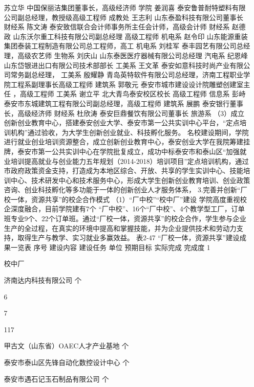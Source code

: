 苏立华
中国保丽洁集团董事长，高级经济师
学院
姜润喜
泰安鲁普耐特塑料有限公司副总经理，教授级高级工程师
成教处
王志利
山东泰盈科技有限公司董事长
财经系
陈文涛
泰安致信联合会计师事务所主任会计师，高级会计师
财经系
赵德政
山东沃尔重工科技有限公司副总经理  高级工程师
机电系
赵令印
山东能源重装集团泰装工程制造有限公司总工程师，高工
机电系
刘桂军
泰丰园艺有限公司总经理，高级农艺师
生物系
刘庆山
山东泰医医疗器械有限公司总经理
汽电系
纪恩峰
山东岱银进出口有限公司技术部部长
工美系
王文革
泰安如意科技时尚产业有限公司常务副总经理，
工美系
殷耀静
青岛英特软件有限公司总经理，济南工程职业学院工程系副理事长高级工程师
建筑系
郭敬元
泰安市城市建设设计院雕塑创建室主任 ，高级工程师
工美系
谢立平
北大青鸟泰安校区校长 高级工程师
信息系
彭峙
泰安市东城建筑工程有限公司副总经理，高级工程师
建筑系
展鹏
泰安银行董事长，高级经济师
财经系
杜欣涛
泰安巨鼎餐饮有限公司董事长
旅游系
（3）成立创新创业教育中心，搭建泰安创业大学、泰安市第一公共实训中心平台，“定点培训机构”通过验收，为大学生创新创业就业、科技孵化服务。
名校建设期间，学院进行就业创业培训资源整合，成立创新创业教育中心，泰安创业大学在我院筹建挂牌，泰安市第一公共实训中心在学院批复成立，成功中标泰安市和泰山区“加强就业培训提高就业与创业能力五年规划（2014-2018）培训项目”定点培训机构，通过市政府政策资金支持，打造成为本地区综合、开放、共享的学生实训中心、技能培训中心、技术研发中心和技术服务中心，形成大学生创新创业教育培训、创业政策咨询、创业科技孵化等多功能于一体的创新创业人才服务体系，
3.完善并创新“厂校一体，资源共享”的校企合作模式
（1）“厂中校”“校中厂”建设
学院高度重视校企深度融合，目前学院建有7个 “厂中校”、16个“厂中校”、4个教学型工厂，订单班专业9个、22个订单班。通过“厂校一体，资源共享”的校企合作，学生参与企业生产的全过程，在真实的环境中提高和掌握技能，并为企业提供技术和劳动力支持，取得生产与教学、实习就业多赢效益。 
表2-47  “厂校一体，资源共享”建设成果一览表
序号
建设内容
建设任务
单位
预期目标
实际完成
完成度
1

校中厂

济南达内科技有限公司
个

6


7


117%



甲古文（山东省）OAEC人才产业基地
个





泰安市泰山区先锋自动化数控设计中心
个





泰安市遇石记玉石制品有限公司
个





